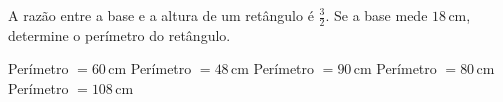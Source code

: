 A razão entre a base e a altura de um retângulo é $\frac{3}{2}$. Se a base mede $18$\,cm, determine o perímetro do retângulo.

Perímetro $=60$\,cm
Perímetro $=48$\,cm
Perímetro $=90$\,cm
Perímetro $=80$\,cm
Perímetro $=108$\,cm



